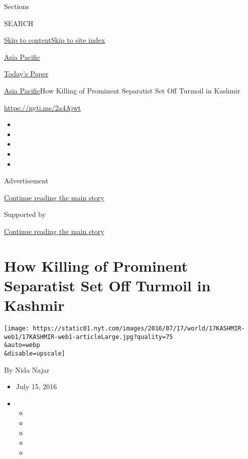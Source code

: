 Sections

SEARCH

\protect\hyperlink{site-content}{Skip to
content}\protect\hyperlink{site-index}{Skip to site index}

\href{https://www.nytimes.com/section/world/asia}{Asia Pacific}

\href{https://myaccount.nytimes.com/auth/login?response_type=cookie\&client_id=vi}{}

\href{https://www.nytimes.com/section/todayspaper}{Today's Paper}

\href{/section/world/asia}{Asia Pacific}\textbar{}How Killing of
Prominent Separatist Set Off Turmoil in Kashmir

\url{https://nyti.ms/2a4Ajwt}

\begin{itemize}
\item
\item
\item
\item
\item
\end{itemize}

Advertisement

\protect\hyperlink{after-top}{Continue reading the main story}

Supported by

\protect\hyperlink{after-sponsor}{Continue reading the main story}

\hypertarget{how-killing-of-prominent-separatist-set-off-turmoil-in-kashmir}{%
\section{How Killing of Prominent Separatist Set Off Turmoil in
Kashmir}\label{how-killing-of-prominent-separatist-set-off-turmoil-in-kashmir}}

\texttt{[image: https://static01.nyt.com/images/2016/07/17/world/17KASHMIR-web1/17KASHMIR-web1-articleLarge.jpg?quality=75\\\&auto=webp\\\&disable=upscale]}

By Nida Najar

\begin{itemize}
\item
  July 15, 2016
\item
  \begin{itemize}
  \item
  \item
  \item
  \item
  \item
  \end{itemize}
\end{itemize}

